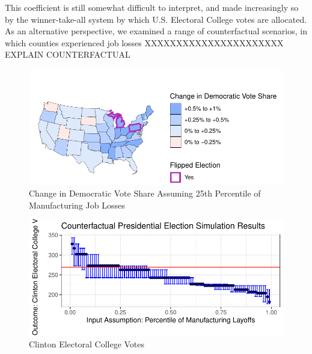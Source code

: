 \documentclass[]{AEA}
\begin{document}
This coefficient is still somewhat difficult to interpret, and made
increasingly so by the winner-take-all system by which U.S. Electoral
College votes are allocated. As an alternative perspective, we examined
a range of counterfactual scenarios, in which counties experienced job
losses XXXXXXXXXXXXXXXXXXXXXX EXPLAIN COUNTERFACTUAL

\begin{figure} \label{counterfactual1}
\caption{Change in Democratic Vote Share Assuming 25th Percentile of Manufacturing Job Losses}

\begin{center}\includegraphics{Final-Draft_files/figure-latex/unnamed-chunk-6-1} \end{center}
\end{figure}

\begin{figure} \label{counterfactual2}
\caption{Clinton Electoral College Votes}

\begin{center}\includegraphics{Final-Draft_files/figure-latex/unnamed-chunk-7-1} \end{center}
\end{figure}
\end{document}

